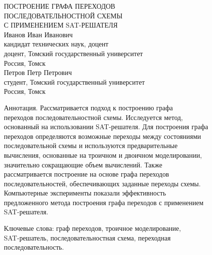 \documentclass[12pt]{article}
\begin{document}
\setcounter{equation}{2}
\pagestyle{fancy}
\fancyhf{}

\renewcommand{\headrulewidth}{0pt}
\begin{center}
ПОСТРОЕНИЕ ГРАФА ПЕРЕХОДОВ\\
ПОСЛЕДОВАТЕЛЬНОСТНОЙ СХЕМЫ\\
С ПРИМЕНЕНИЕМ SAT-РЕШАТЕЛЯ\\
Иванов Иван Иванович\\
кандидат технических наук, доцент\\
доцент, Томский государственный университет\\
Россия, Томск\\
Петров Петр Петрович\\
студент, Томский государственный университет\\
Россия, Томск\\
\end{center}

\hspace{0.5cm}
Аннотация. Рассматривается подход к построению графа\\
переходов последовательностной схемы. Исследуется метод,\\
основанный на использовании SAT-решателя. Для построения графа\\
переходов определяются возможные переходы между состояниями\\
последовательной схемы и используются предварительные\\
вычисления, основанные на троичном и двоичном моделировании,\\
значительно сокращающие объем вычислений. Также\\
рассматривается построение на основе графа переходов\\
последовательностей, обеспечивающих заданные переходы схемы.\\
Компьютерные эксперименты показали эффективность\\
предложенного метода построения графа переходов с применением\\
SAT-решателя.

\hspace{0.5cm}
Ключевые слова: граф переходов, троичное моделирование,\\
SAT-решатель, последовательностная схема, переходная\\
последовательность.\\
\end{document}
